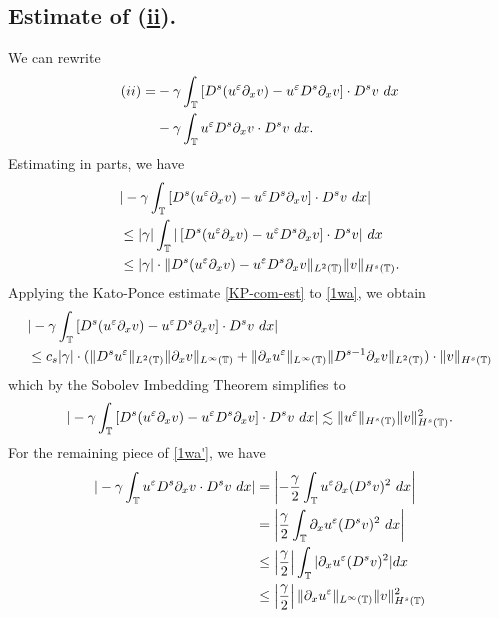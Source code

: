 \subsection{ Estimate of (\hyperref[8u]{ii}).} We can rewrite
	\begin{equation}
		\begin{split}
			(ii)
			= & -\gamma \int_{\mathbb{T}} \left[ D^s(u^\varepsilon \partial_x v) - u^\varepsilon D^s
			\partial_x v \right] \cdot D^s v \ dx
			\\
			& -  \gamma \int_{\mathbb{T}} u^\varepsilon D^s \partial_x v \cdot D^s v \ dx.
			\label{1wa'}
		\end{split}
	\end{equation}
	Estimating in parts, we have
	\begin{equation}
		\begin{split}
			& |-\gamma \int_{\mathbb{T}} \left[ D^s(u^\varepsilon \partial_x v) - u^\varepsilon D^s
			\partial_x v \right] \cdot D^s v \ dx |
			\\
			& \le |\gamma| \int_{\mathbb{T}} |\left[ D^s(u^\varepsilon \partial_x v) - u^\varepsilon D^s
			\partial_x v \right] \cdot D^s v| \ dx
			\\
			& \le |\gamma| \cdot \|D^s (u^\varepsilon \partial_x v) - u^\varepsilon D^s \partial_x v
			\|_{L^2(\mathbb{T})} \|v\|_{H^s(\mathbb{T})}.
			\label{1wa}
		\end{split}
	\end{equation}
	Applying the Kato-Ponce estimate \eqref{KP-com-est} to \eqref{1wa}, we
	obtain
	\begin{equation*}
		\begin{split}
			& | -\gamma \int_{\mathbb{T}} \left[ D^s(u^\varepsilon \partial_x v) - u^\varepsilon D^s
			\partial_x v \right] \cdot D^s v \ dx |
			\\
			& \le c_s |\gamma| \cdot ( \|D^s u^\varepsilon \|_{L^2(\mathbb{T})} \|\partial_x
			v\|_{L^\infty(\mathbb{T})} + \|\partial_x u^\varepsilon \|_{L^\infty(\mathbb{T})} \|D^{s-1}
			\partial_x v \|_{L^2(\mathbb{T})}) \cdot \|v\|_{H^s(\mathbb{T})}
		\end{split}
	\end{equation*}
	which by the Sobolev Imbedding Theorem simplifies to
	\begin{equation}
		\begin{split}
			| -\gamma \int_{\mathbb{T}} \left[ D^s(u^\varepsilon \partial_x v) - u^\varepsilon D^s
			\partial_x v \right] \cdot D^s v \ dx |
			\lesssim \|u^\varepsilon \|_{H^s(\mathbb{T})} \|v\|_{H^s(\mathbb{T})}^2.
			\label{2wa}
		\end{split}
	\end{equation}
	For the remaining piece of \eqref{1wa'}, we have
	\begin{equation*}
		\begin{split}
			| - \gamma \int_{\mathbb{T}} u^\varepsilon D^s \partial_x v \cdot D^s v \ dx |
			& = \left | -\frac{\gamma}{2} \int_{\mathbb{T}} u^\varepsilon \partial_x (D^s v)^2 \
			dx \right |
			\\
			& = \left | \frac{\gamma}{2} \int_{\mathbb{T}} \partial_x u^\varepsilon (D^s v)^2 \ dx
			\right |
			\\
			& \le \left | \frac{\gamma}{2} \right | \int_{\mathbb{T}} |\partial_x u^\varepsilon
			(D^s v)^2 | dx
			\\
			& \le \left | \frac{\gamma}{2} \right | \|\partial_x u^\varepsilon
			\|_{L^\infty(\mathbb{T})} \|v\|_{H^s(\mathbb{T})}^2
		\end{split}
	\end{equation*}
